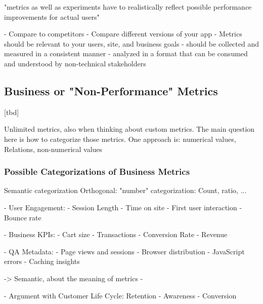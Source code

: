 "metrics as well as experiments have to realistically reflect possible performance improvements for actual users"


- Compare to competitors
- Compare different versions of your app
- Metrics should be relevant to your users, site, and business goals
- should be collected and measured in a consistent manner
- analyzed in a format that can be consumed and understood by non-technical stakeholders










\subsection{Business or "Non-Performance" Metrics}


[tbd]

Unlimited metrics, also when thinking about custom metrics.
The main question here is how to categorize those metrics.
One approach is: numerical values, Relations, non-numerical values






\subsubsection{Possible Categorizations of Business Metrics}


Semantic categorization
Orthogonal: "number" categorization: Count, ratio, ...


- User Engagement:
	- Session Length
	- Time on site
	- First user interaction
	- Bounce rate

- Business KPIs:
	- Cart size
	- Transactions
	- Conversion Rate
	- Revenue

- QA Metadata:
	- Page views and sessions
	- Browser distribution
	- JavaScript errors
	- Caching insights
	
-> Semantic, about the meaning of metrics
- 
	
	
- Argument with Customer Life Cycle: Retention - Awareness - Conversion

